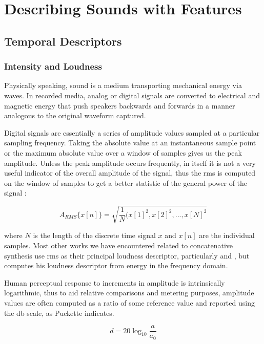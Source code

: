 {{\section{Describing Sounds with Features}

\subsection{Temporal Descriptors}

\subsubsection{Intensity and Loudness}

Physically speaking, sound is a medium transporting mechanical energy via waves. In recorded media, analog or digital signals are converted to electrical and magnetic energy that push speakers backwards and forwards in a manner analogous to the original waveform captured.

Digital signals are essentially a series of amplitude values sampled at a particular sampling frequency. Taking the absolute value at an instantaneous sample point or the maximum absolute value over a window of samples gives us the peak amplitude. Unless the peak amplitude occurs frequently, in itself it is not a very useful indicator of the overall amplitude of the signal, thus the \acrfull{rms} is computed on the window of samples to get a better statistic of the general power of the signal \citep{Puckette2006}:

\begin{equation}
\label{eq:rms}	
A_{RMS}\{x[n]\} = \sqrt{\frac{1}{N}(x[1]^2, x[2]^2,..., x[N]^2}
\end{equation}

where $N$ is the length of the discrete time signal $x$ and $x[n]$ are the individual samples. Most other works we have encountered related to concatenative synthesis use \acrshort{rms} as their principal loudness descriptor, particularly \cite{Sturm2004} and \cite{Bernardes2013}, but \cite{Jehan2005} computes his loudness descriptor from energy in the frequency domain.

Human perceptual response to increments in amplitude is intrinsically logarithmic, thus to aid relative comparisons and metering purposes, amplitude values are often computed as a ratio of some reference value and reported using the \acrfull{db} scale, as Puckette \citeyearpar{Puckette2006} indicates. 

\begin{equation}
\label{eq:decibel}	
d = 20\log_{10}{\frac{a}{a_{0}}}
\end{equation}

}}
